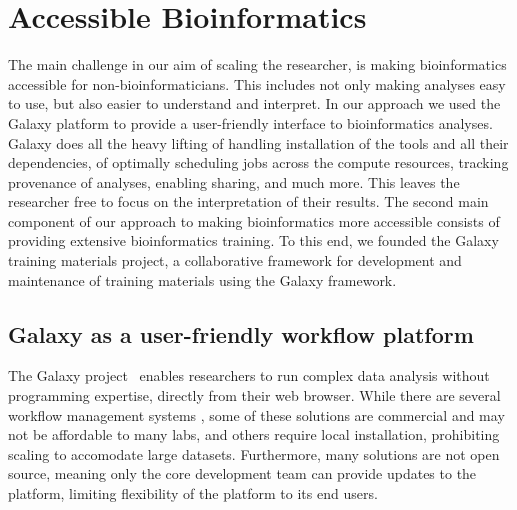 

\section{Accessible Bioinformatics}

The main challenge in our aim of scaling the researcher, is making bioinformatics accessible for non-bioinformaticians. This includes not only making analyses easy to use, but also easier to understand and interpret.
In our approach we used the Galaxy platform to provide a user-friendly interface to bioinformatics analyses. Galaxy does all the heavy lifting of handling installation of the tools and all their dependencies, of optimally scheduling jobs across the compute resources, tracking provenance of analyses, enabling sharing, and much more. This leaves the researcher free to focus on the interpretation of their results.
The second main component of our approach to making bioinformatics more accessible consists of providing extensive bioinformatics training. To this end, we founded the Galaxy training materials project, a collaborative framework for development and maintenance of training materials using the Galaxy framework.


\subsection{Galaxy as a user-friendly workflow platform}

The Galaxy project~\cite{giardine2005galaxy,blankenberg2010galaxy,afgan2016galaxy} enables researchers to run complex data analysis without programming expertise, directly from their web browser. While there are several workflow management systems \cite{clcbio,taverna,onlinehpc,anduril,molgenis}, some of these solutions are commercial and may not be affordable to many labs, and others require local installation, prohibiting scaling to accomodate large datasets. Furthermore, many solutions are not open source, meaning only the core development team can provide updates to the platform, limiting flexibility of the platform to its end users.

